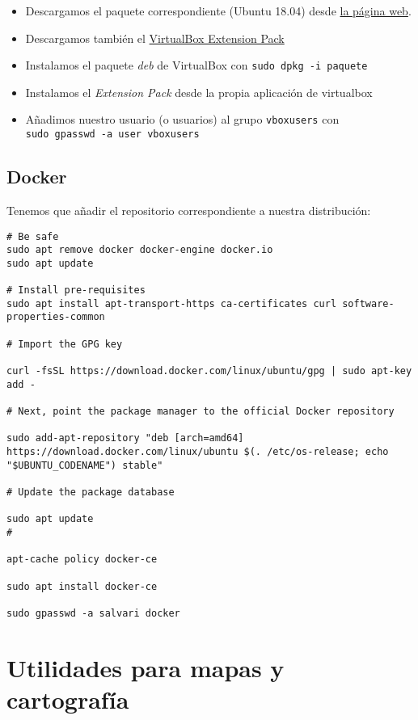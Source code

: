 \documentclass[
  12pt,
  spanish,
]{article}
\providecommand{\tightlist}{%
  \setlength{\itemsep}{0pt}\setlength{\parskip}{0pt}}
\begin{document}
\begin{itemize}
\tightlist
\item
  Descargamos el paquete correspondiente (Ubuntu 18.04) desde
  \href{https://www.virtualbox.org/wiki/Linux_Downloads}{la página web}.
\item
  Descargamos también el
  \href{https://www.virtualbox.org/wiki/Downloads}{VirtualBox Extension
  Pack}
\item
  Instalamos el paquete \emph{deb} de VirtualBox con
  \texttt{sudo\ dpkg\ -i\ paquete}
\item
  Instalamos el \emph{Extension Pack} desde la propia aplicación de
  virtualbox
\item
  Añadimos nuestro usuario (o usuarios) al grupo \texttt{vboxusers} con
  \texttt{sudo\ gpasswd\ -a\ user\ vboxusers}
\end{itemize}

\hypertarget{docker}{%
\subsection{Docker}\label{docker}}

Tenemos que añadir el repositorio correspondiente a nuestra
distribución:

\begin{verbatim}
# Be safe
sudo apt remove docker docker-engine docker.io
sudo apt update

# Install pre-requisites
sudo apt install apt-transport-https ca-certificates curl software-properties-common

# Import the GPG key

curl -fsSL https://download.docker.com/linux/ubuntu/gpg | sudo apt-key add -

# Next, point the package manager to the official Docker repository

sudo add-apt-repository "deb [arch=amd64] https://download.docker.com/linux/ubuntu $(. /etc/os-release; echo "$UBUNTU_CODENAME") stable"

# Update the package database

sudo apt update
#

apt-cache policy docker-ce

sudo apt install docker-ce

sudo gpasswd -a salvari docker
\end{verbatim}

\hypertarget{utilidades-para-mapas-y-cartografuxeda}{%
\section{Utilidades para mapas y
cartografía}\label{utilidades-para-mapas-y-cartografuxeda}}
\end{document}
